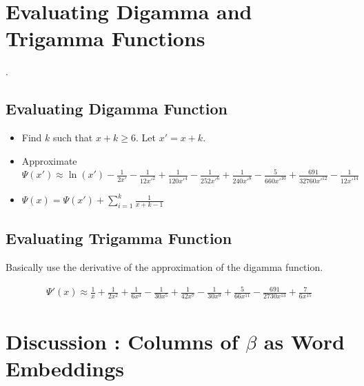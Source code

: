 \documentclass[a4]{article}
\begin{document}



\section{Evaluating Digamma and Trigamma Functions}\label{digamma_trigamma}.

\subsection{Evaluating Digamma Function}

\begin{itemize}
\item Find $k$ such that $x+k \ge 6$. Let $x' = x + k$.
\item Approximate $\Psi(x') \approx \ln(x') - \frac{1}{2x'} 
- \frac{1}{12x'^2}
+ \frac{1}{120x'^4}
- \frac{1}{252x'^6}
+ \frac{1}{240x'^8}
- \frac{5}{660x'^{10}}
+ \frac{691}{32760x'^{12}}
- \frac{1}{12x'^{14}}$
\item $\Psi(x) = \Psi(x') + \sum_{i=1}^k\frac{1}{x+k-1}$
\end{itemize}


\subsection{Evaluating Trigamma Function}
Basically use the derivative of the approximation of the digamma function.

\begin{equation}
\begin{aligned}
\Psi'(x) \approx 
  \frac{1}{x} 
+ \frac{1}{2x^2} 
+ \frac{1}{6x^3}
- \frac{1}{30x^5}
+ \frac{1}{42x^7}
- \frac{1}{30x^9}
+ \frac{5}{66x^{11}}
- \frac{691}{2730x^{13}}
+ \frac{7}{6x^{15}}
\end{aligned}
\end{equation}




\section{Discussion : Columns of $\beta$ as Word Embeddings }
\end{document}
